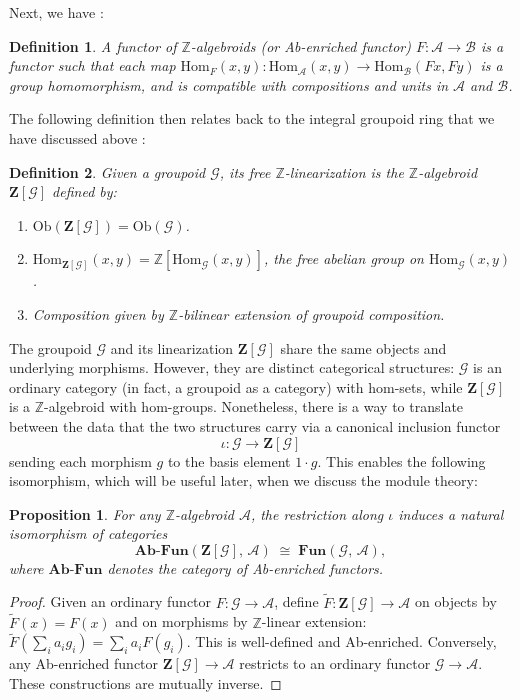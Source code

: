\documentclass[a4paper,12pt]{article}
\newtheorem{proposition}{Proposition}[section]
\newtheorem{definition}{Definition}[section]
\newcommand{\Z}{\mathbb{Z}}
\newcommand{\Zb}{\mathbf{Z}}
\newcommand{\calG}{\mathcal{G}}
\newcommand{\Ob}{\mathrm{Ob}}
\newcommand{\Hom}{\mathrm{Hom}}
\newcommand{\Fun}{\mathbf{Fun}}
\newcommand{\AbFun}{\mathbf{Ab\text{-}Fun}}
\begin{document}
Next, we have \cite{Kelly1982, mitchell1985, mitchener2014}:    
\begin{definition}      
A \emph{functor of $\Z$-algebroids} (or \emph{Ab-enriched functor})    
$F : \mathcal{A} \to \mathcal{B}$ is a functor such that each map
$\Hom_F (x,y) : \Hom_\mathcal{A}(x,y) \to \Hom_\mathcal{B}(Fx, Fy)$ is a group  homomorphism, and is compatible with compositions and units in $\mathcal{A}$ and $\mathcal{B}$.   
\end{definition}   

The following definition then relates back to the integral groupoid ring that we have discussed above \cite{mitchell1985, mitchener2014, avi2026, nlab:ab-enriched_category}:    
\begin{definition}  
Given a groupoid $\calG$, its \emph{free $\Z$-linearization} is the
$\Z$-algebroid $\Zb[\calG]$ defined by:
\begin{enumerate}  
  \item $\Ob(\Zb[\calG]) = \Ob(\calG)$.
  \item $\Hom_{\Zb[\calG]}(x,y) = \Z[\Hom_{\calG}(x,y)]$, the free abelian
        group on $\Hom_{\calG}(x,y)$.
  \item Composition given by $\Z$-bilinear extension of groupoid
        composition.
\end{enumerate}
\end{definition}


The groupoid $\calG$ and its linearization $\Zb[\calG]$ share the same objects and underlying morphisms. However, they are distinct categorical structures: $\calG$ is an ordinary category (in fact, a groupoid as a category) with 
hom-sets, while $\Zb[\calG]$ is a $\Z$-algebroid with hom-groups. 
Nonetheless, there is a way to translate between the data that the two structures carry via a canonical inclusion functor 
$$\iota : \calG \to \Zb[\calG]$$  
sending each morphism $g$ to the basis element $1 \cdot g$. This enables the following isomorphism, which will be useful later, when we discuss the module theory:    
\begin{proposition}
\label{prop4.1v1}  
For any $\Z$-algebroid $\mathcal{A}$, the restriction along $\iota$ induces
a natural isomorphism of categories
\[
  \AbFun(\Zb[\calG],\, \mathcal{A}) \;\cong\; \Fun(\calG,\, \mathcal{A}),
\]
where $\AbFun$ denotes the category of Ab-enriched functors. 
\end{proposition}
\begin{proof}
Given an ordinary functor $F : \calG \to \mathcal{A}$, define
$\tilde{F} : \Zb[\calG] \to \mathcal{A}$ on objects by
$\tilde{F}(x) = F(x)$ and on morphisms by $\Z$-linear extension:
$\tilde{F}\!\left(\sum_i a_i g_i\right) = \sum_i a_i F(g_i)$. This is
well-defined and Ab-enriched. Conversely, any Ab-enriched functor
$\Zb[\calG] \to \mathcal{A}$ restricts to an ordinary functor
$\calG \to \mathcal{A}$. These constructions are mutually inverse.
\end{proof}
\end{document}
